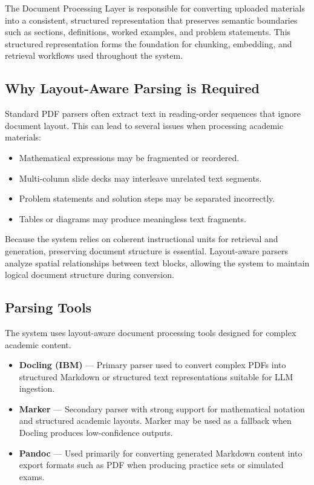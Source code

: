 \documentclass[11pt]{article}
\begin{document}
The Document Processing Layer is responsible for converting uploaded materials into a consistent, structured representation that preserves semantic boundaries such as sections, definitions, worked examples, and problem statements. This structured representation forms the foundation for chunking, embedding, and retrieval workflows used throughout the system.

\subsection{Why Layout-Aware Parsing is Required}
Standard PDF parsers often extract text in reading-order sequences that ignore document layout. This can lead to several issues when processing academic materials:

\begin{itemize}
\item Mathematical expressions may be fragmented or reordered.
\item Multi-column slide decks may interleave unrelated text segments.
\item Problem statements and solution steps may be separated incorrectly.
\item Tables or diagrams may produce meaningless text fragments.
\end{itemize}

Because the system relies on coherent instructional units for retrieval and generation, preserving document structure is essential. Layout-aware parsers analyze spatial relationships between text blocks, allowing the system to maintain logical document structure during conversion.

\subsection{Parsing Tools}
The system uses layout-aware document processing tools designed for complex academic content.

\begin{itemize}
\item \textbf{Docling (IBM)} --- Primary parser used to convert complex PDFs into structured Markdown or structured text representations suitable for LLM ingestion.
\item \textbf{Marker} --- Secondary parser with strong support for mathematical notation and structured academic layouts. Marker may be used as a fallback when Docling produces low-confidence outputs.
\item \textbf{Pandoc} --- Used primarily for converting generated Markdown content into export formats such as PDF when producing practice sets or simulated exams.
\end{itemize}
\end{document}

